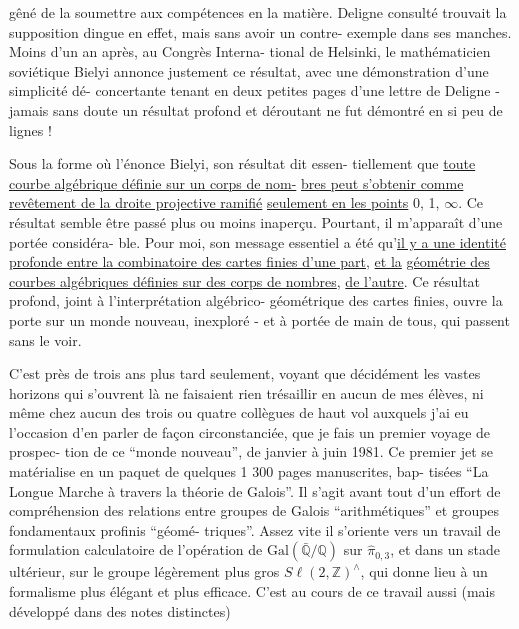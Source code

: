 
gêné de la soumettre aux compétences en la matière. Deligne consulté
trouvait la supposition dingue en effet, mais sans avoir un contre-%
exemple dans ses manches. Moins d'un an après, au Congrès Interna-%
tional de Helsinki, le mathématicien soviétique Bielyi annonce
justement ce résultat, avec une démonstration d'une simplicité dé-%
concertante tenant en deux petites pages d'une lettre de Deligne -
jamais sans doute un résultat profond et déroutant ne fut démontré
en si peu de lignes !

Sous la forme où l'énonce Bielyi, son résultat dit essen-%
tiellement que \uline{toute courbe algébrique définie sur un corps de nom-}%
\uline{bres peut s'obtenir comme revêtement de la droite projective ramifié}
\uline{seulement en les points} 0, 1, $\infty$. Ce résultat semble être passé plus
ou moins inaperçu. Pourtant, il m'apparaît d'une portée considéra-%
ble. Pour moi, son message essentiel a été qu'\uline{il y a une identité}
\uline{profonde entre la combinatoire des cartes finies d'une part}, \uline{et la}
\uline{géométrie des courbes algébriques définies sur des corps de nombres},
\uline{de l'autre}. Ce résultat profond, joint à l'interprétation algébrico-%
géométrique des cartes finies, ouvre la porte sur un monde nouveau,
inexploré - et à portée de main de tous, qui passent sans le voir.

C'est près de trois ans plus tard seulement, voyant que
décidément les vastes horizons qui s'ouvrent là ne faisaient rien
trésaillir en aucun de mes élèves, ni même chez aucun des trois ou
quatre collègues de haut vol auxquels j'ai eu l'occasion d'en parler
de façon circonstanciée, que je fais un premier voyage de prospec-%
tion de ce ``monde nouveau'', de janvier à juin 1981. Ce premier jet se
matérialise en un paquet de quelques 1 300 pages manuscrites, bap-%
tisées ``La Longue Marche à travers la théorie de Galois''. Il s'agit
avant tout d'un effort de compréhension des relations entre groupes
de Galois ``arithmétiques'' et groupes fondamentaux profinis ``géomé-%
triques''. Assez vite il s'oriente vers un travail de formulation
calculatoire de l'opération de $\mathrm{Gal}(\bar{\mathbb{Q}}/\mathbb{Q})$ sur $\hat{\pi}_{0,3}$, et dans un
stade ultérieur, sur le groupe légèrement plus gros $S\ell(2,\mathbb{Z})^{\wedge}$, qui
donne lieu à un formalisme plus élégant et plus efficace. C'est au
cours de ce travail aussi (mais développé dans des notes distinctes)

